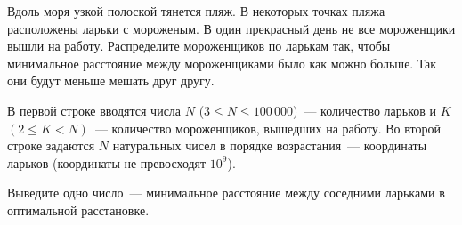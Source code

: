 Вдоль моря узкой полоской тянется пляж. В некоторых точках пляжа расположены
ларьки с мороженым. В один прекрасный день не все мороженщики вышли на работу.
Распределите мороженщиков по ларькам так, чтобы минимальное расстояние между
мороженщиками было как можно больше. Так они будут меньше мешать друг другу.

\InputFile

В первой строке вводятся числа $N$ ($3 \le N \le 100\,000$)~--- количество ларьков
и $K$ $(2 \le K < N)$~--- количество мороженщиков, вышедших на работу. 
Во второй строке задаются $N$ натуральных чисел в порядке возрастания~--- координаты ларьков (координаты не превосходят $10^9$).

\OutputFile

Выведите одно число~--- минимальное расстояние между соседними ларьками
в оптимальной расстановке.

\SAMPLES
